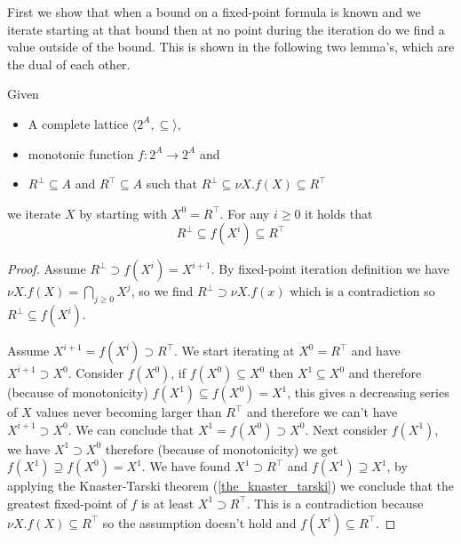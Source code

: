 First we show that when a bound on a fixed-point formula is known and we iterate starting at that bound then at no point during the iteration do we find a value outside of the bound. This is shown in the following two lemma's, which are the dual of each other.
\begin{lemma}
	\label{lem_fixpoint_bounds_nu}
	Given
	\begin{itemize}
		\item A complete lattice $\langle 2^A, \subseteq \rangle$,
		\item monotonic function $f : 2^A \rightarrow 2^A$ and
		\item $R^\bot \subseteq A$ and $R^\top \subseteq A$ such that $R^\bot \subseteq \nu X. f(X) \subseteq R^\top$
	\end{itemize}
	we iterate $X$ by starting with $X^0 = R^\top$. For any $i \geq 0$ it holds that
	\[ R^\bot \subseteq f(X^i) \subseteq R^\top \]
	\begin{proof}
		Assume $R^\bot \supset f(X^i) = X^{i+1}$. By fixed-point iteration definition we have $\nu X.f(X) = \bigcap_{j\geq0} X^j$, so we find $R^\bot \supset \nu X.f(x)$ which is a contradiction so $R^\bot \subseteq f(X^i)$.
		
		Assume $X^{i+1} = f(X^i) \supset R^\top$. We start iterating at $X^0 = R^\top$ and have $X^{i+1} \supset X^0$. Consider $f(X^0)$, if $f(X^0) \subseteq X^0$ then $X^1 \subseteq X^0$ and therefore (because of monotonicity) $f(X^1) \subseteq f(X^0) = X^1$, this gives a decreasing series of $X$ values never becoming larger than $R^\top$ and therefore we can't have $X^{i+1} \supset X^0$. We can conclude that $X^1 = f(X^0) \supset X^0$. Next consider $f(X^1)$, we have $X^1 \supset X^0$ therefore (because of monotonicity) we get $f(X^1) \supseteq f(X^0) = X^1$. We have found $X^1 \supset R^\top$ and $f(X^1) \supseteq X^1$, by applying the Knaster-Tarski theorem (\ref{the_knaster_tarski}) we conclude that the greatest fixed-point of $f$ is at least $X^1 \supset R^\top$. This is a contradiction because $\nu X.f(X) \subseteq R^\top$ so the assumption doesn't hold and $f(X^i) \subseteq R^\top$.
	\end{proof}
\end{lemma}

